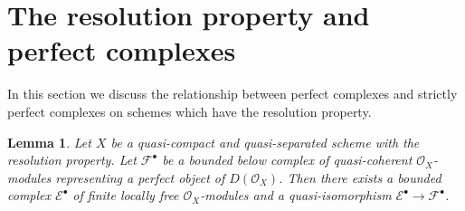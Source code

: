 \documentclass{stacks-project}
\theoremstyle{plain}
\newtheorem{lemma}[subsection]{Lemma}
\theoremstyle{definition}
\theoremstyle{remark}
\numberwithin{equation}{subsection}
\begin{document}
\section{The resolution property and perfect complexes}
\label{section-resolution-property-perfect}

\noindent
In this section we discuss the relationship between perfect complexes
and strictly perfect complexes on schemes which have the resolution property.

\begin{lemma}
\label{lemma-construct-strictly-perfect}
Let $X$ be a quasi-compact and quasi-separated scheme with the
resolution property.
Let $\mathcal{F}^\bullet$ be a bounded below complex of quasi-coherent
$\mathcal{O}_X$-modules representing a perfect object of
$D(\mathcal{O}_X)$. Then there exists a bounded complex
$\mathcal{E}^\bullet$ of finite locally free $\mathcal{O}_X$-modules
and a quasi-isomorphism $\mathcal{E}^\bullet \to \mathcal{F}^\bullet$.
\end{lemma}
\end{document}
